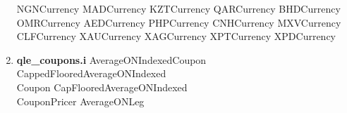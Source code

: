 \documentclass[10pt]{article}
\begin{document}
\begin{multicols}{2}
\begin{enumerate}
                \subitem NGNCurrency
                \subitem MADCurrency
                \subitem KZTCurrency
                \subitem QARCurrency
                \subitem BHDCurrency
                \subitem OMRCurrency
                \subitem AEDCurrency
                \subitem PHPCurrency
                \subitem CNHCurrency
                \subitem MXVCurrency
                \subitem CLFCurrency
                \subitem XAUCurrency
                \subitem XAGCurrency
                \subitem XPTCurrency
                \subitem XPDCurrency
        \item \textbf{qle\_coupons.i}
                \subitem AverageONIndexedCoupon
                \subitem CappedFlooredAverageONIndexed \\ \-\hspace{0.70cm}Coupon
                \subitem CapFlooredAverageONIndexed \\ \-\hspace{0.70cm}CouponPricer
                \subitem AverageONLeg
    \end{enumerate}
\end{multicols}

\pagebreak
\end{document}
